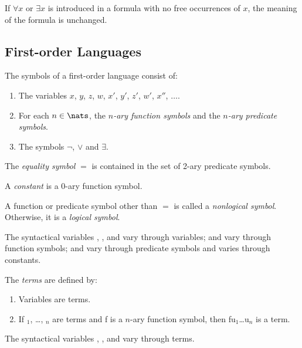 \begin{remark}
	If $\forall x$ or $\exists x$ is introduced in a formula with no free occurrences of $x$,
	the meaning of the formula is unchanged.
\end{remark}

\subsection{First-order Languages}

\begin{definition}
	The symbols of a first-order language consist of:
	\begin{enumerate}
		\item The variables $x$, $y$, $z$, $w$, $x'$, $y'$, $z'$, $w'$, $x''$, $\dots$.
		\item For each $n \in \nats$, the \emph{$n$-ary function symbols} and the 
		\emph{$n$-ary predicate symbols}.
		\item The symbols $\lnot$, $\lor$ and $\exists$.
	\end{enumerate}
	The \emph{equality symbol} $=$ is contained in the set of 2-ary predicate symbols.

	A \emph{constant} is a 0-ary function symbol.

	A function or predicate symbol other than $=$ is called a \emph{nonlogical symbol}. Otherwise,
	it is a \emph{logical symbol}.
\end{definition}

\begin{convention}
	The syntactical variables , ,  and  vary through
	variables;  and  vary through function symbols;  and 
	vary through predicate symbols and  varies through constants.
\end{convention}

\begin{definition}[Term]
	The \emph{terms} are defined by:
	\begin{enumerate}
		\item Variables are terms.
		\item If $_1$, \dots, $_n$ are terms and \synt f is a $n$-ary function
		symbol, then \synt f\synt u$_1$\dots\synt u$_n$ is a term.
	\end{enumerate}
	The syntactical variables , ,  and  vary through
	terms.
\end{definition}

